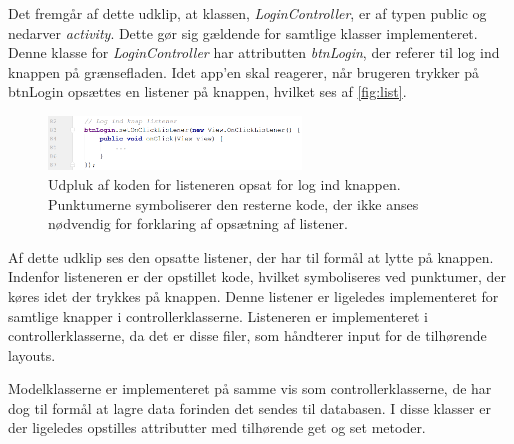 Det fremgår af dette udklip, at klassen, \textit{LoginController}, er af typen public og nedarver \textit{activity}. Dette gør sig gældende for samtlige klasser implementeret. Denne klasse for \textit{LoginController} har attributten \textit{btnLogin}, der referer til log ind knappen på grænsefladen. Idet app'en skal reagerer, når brugeren trykker på btnLogin opsættes en listener på knappen, hvilket ses af \autoref{fig:list}.

\begin{figure} [H]
\centering
\includegraphics[width=0.6\textwidth]{figures/imple/list}
\caption{Udpluk af koden for listeneren opsat for log ind knappen. Punktumerne symboliserer den resterne kode, der ikke anses nødvendig for forklaring af opsætning af listener.}
\label{fig:list}
\end{figure}

Af dette udklip ses den opsatte listener, der har til formål at lytte på knappen. Indenfor listeneren er der opstillet kode, hvilket symboliseres ved punktumer, der køres idet der trykkes på knappen. Denne listener er ligeledes implementeret for samtlige knapper i controllerklasserne. Listeneren er implementeret i controllerklasserne, da det er disse filer, som håndterer input for de tilhørende layouts.

Modelklasserne er implementeret på samme vis som controllerklasserne, de har dog til formål at lagre data forinden det sendes til databasen. I disse klasser er der ligeledes opstilles attributter med tilhørende get og set metoder. 

